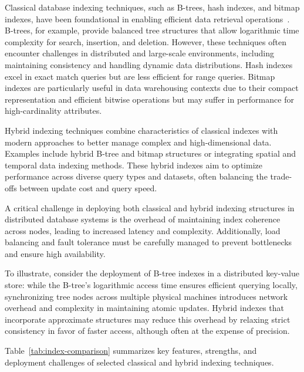 \documentclass[sigconf]{acmart}
\begin{document}
Classical database indexing techniques, such as B-trees, hash indexes, and bitmap indexes, have been foundational in enabling efficient data retrieval operations~\cite{}. B-trees, for example, provide balanced tree structures that allow logarithmic time complexity for search, insertion, and deletion. However, these techniques often encounter challenges in distributed and large-scale environments, including maintaining consistency and handling dynamic data distributions. Hash indexes excel in exact match queries but are less efficient for range queries. Bitmap indexes are particularly useful in data warehousing contexts due to their compact representation and efficient bitwise operations but may suffer in performance for high-cardinality attributes.

Hybrid indexing techniques combine characteristics of classical indexes with modern approaches to better manage complex and high-dimensional data. Examples include hybrid B-tree and bitmap structures or integrating spatial and temporal data indexing methods. These hybrid indexes aim to optimize performance across diverse query types and datasets, often balancing the trade-offs between update cost and query speed.

A critical challenge in deploying both classical and hybrid indexing structures in distributed database systems is the overhead of maintaining index coherence across nodes, leading to increased latency and complexity. Additionally, load balancing and fault tolerance must be carefully managed to prevent bottlenecks and ensure high availability.

To illustrate, consider the deployment of B-tree indexes in a distributed key-value store: while the B-tree's logarithmic access time ensures efficient querying locally, synchronizing tree nodes across multiple physical machines introduces network overhead and complexity in maintaining atomic updates. Hybrid indexes that incorporate approximate structures may reduce this overhead by relaxing strict consistency in favor of faster access, although often at the expense of precision.

Table~\ref{tab:index-comparison} summarizes key features, strengths, and deployment challenges of selected classical and hybrid indexing techniques.
\end{document}
